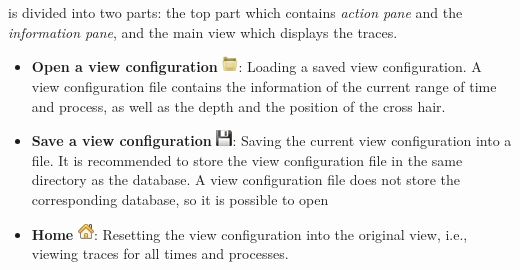 
\section{\traceview}
\label{sec:hpcviewer:panes}

\traceview{} is divided into two parts: the top part which contains \emph{action pane} and the \emph{information pane}, and the main view which displays the traces. 

\begin{itemize}

\item \textbf{Open a view configuration} \includegraphics[scale=.5]{fig/hpctraceviewer-button-open.png}: Loading a saved view configuration. 
A view configuration file contains the information of the current range of time and process, as well as the depth and the position of the cross hair. 
\item \textbf{Save a view configuration} \includegraphics[scale=.5]{fig/hpctraceviewer-button-save.png}: Saving the current view configuration into a file. 
It is recommended to store the view configuration file in the same directory as the database. 
A view configuration file does not store the corresponding database, so it is possible to open 
\item \textbf{Home} \includegraphics[scale=.5]{fig/hpctraceviewer-button-home-screen.png}: Resetting the view configuration into the original view, i.e., viewing traces for all times and processes.


\end{itemize}
